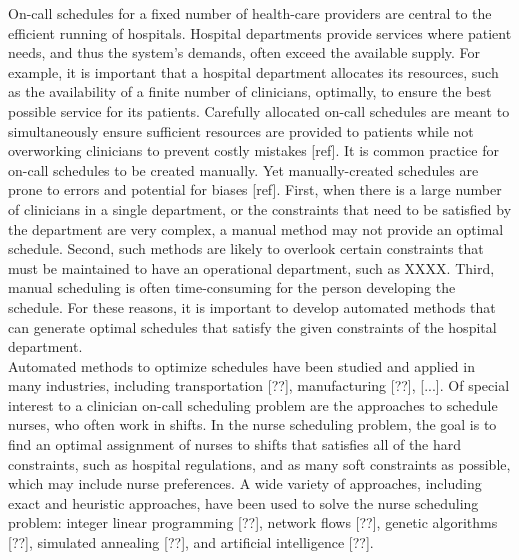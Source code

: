 On-call schedules for a fixed number of health-care providers are central to the efficient running of hospitals. Hospital departments provide services where patient needs, and thus the system's demands, often exceed the available supply. For example, it is important that a hospital department allocates its resources, such as the availability of a finite number of clinicians, optimally, to ensure the best possible service for its patients. Carefully allocated on-call schedules are meant to simultaneously ensure sufficient resources are provided to patients while not overworking clinicians to prevent costly mistakes [ref]. It is common practice for on-call schedules to be created manually. Yet manually-created schedules are prone to errors and potential for biases [ref]. First, when there is a large number of clinicians in a single department, or the constraints that need to be satisfied by the department are very complex, a manual method may not provide an optimal schedule. Second, such methods are likely to overlook certain constraints that must be maintained to have an operational department, such as XXXX. Third, manual scheduling is often time-consuming for the person developing the schedule. For these reasons, it is important to develop automated methods that can generate optimal schedules that satisfy the given constraints of the hospital department. \\

Automated methods to optimize schedules have been studied and applied in many industries, including transportation [??], manufacturing [??], [...]. Of special interest to a clinician on-call scheduling problem are the approaches to schedule nurses, who often work in shifts. In the nurse scheduling problem, the goal is to find an optimal assignment of nurses to shifts that satisfies all of the hard constraints, such as hospital regulations, and as many soft constraints as possible, which may include nurse preferences. A wide variety of approaches, including exact and heuristic approaches, have been used to solve the nurse scheduling problem: integer linear programming [??], network flows [??], genetic algorithms [??], simulated annealing [??], and artificial intelligence [??]. \\


